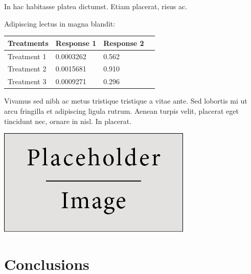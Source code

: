 \documentclass[a0,landscape]{a0poster}
\begin{document}
\begin{multicols}{4}
In hac habitasse platea dictumst. Etiam placerat, risus ac.

Adipiscing lectus in magna blandit:

\begin{center}\vspace{1cm}
\begin{tabular}{l l l l}
\toprule
\textbf{Treatments} & \textbf{Response 1} & \textbf{Response 2} \\
\midrule
Treatment 1 & 0.0003262 & 0.562 \\
Treatment 2 & 0.0015681 & 0.910 \\
Treatment 3 & 0.0009271 & 0.296 \\
\bottomrule
\end{tabular}
\end{center}\vspace{1cm}

Vivamus sed nibh ac metus tristique tristique a vitae ante. Sed lobortis mi ut arcu fringilla et adipiscing ligula rutrum. Aenean turpis velit, placerat eget tincidunt nec, ornare in nisl. In placerat.

\begin{center}\vspace{1cm}
\includegraphics[width=0.8\linewidth]{placeholder}
\end{center}\vspace{1cm}


\color{SaddleBrown} %

\section*{Conclusions}


\end{multicols}
\end{document}
